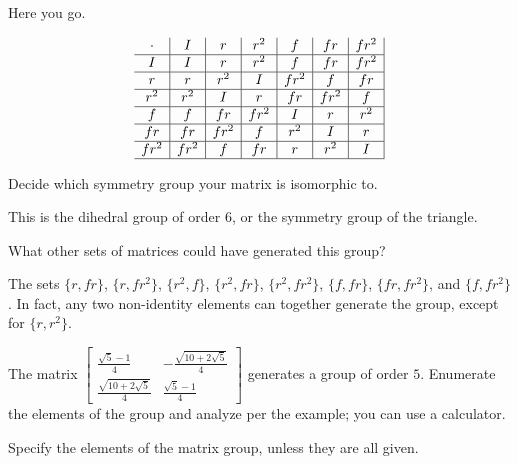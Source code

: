 \documentclass[../key.tex]{subfiles}
\begin{document}
Here you go.

$$\begin{array}{c|c|c|c|c|c|c|}
\cdot & I & r & r^2 & f & fr & fr^2 \\ \hline
I & I & r & r^2 & f & fr & fr^2 \\ \hline
r & r & r^2 & I & fr^2 & f & fr \\ \hline
r^2 & r^2 & I & r & fr & fr^2 & f \\ \hline
f & f & fr & fr^2 & I & r & r^2 \\ \hline
fr & fr & fr^2 & f & r^2 & I & r \\ \hline
fr^2 & fr^2 & f & fr & r & r^2 & I \\ \hline
\end{array}$$

\begin{iinner_problem}
\item Decide which symmetry group your matrix is isomorphic to.
\end{iinner_problem}

This is the dihedral group of order $6$, or the symmetry group of the triangle.

\begin{iinner_problem}
\item What other sets of        matrices could have generated this group?
\end{iinner_problem}

The sets $\{r, fr\}$, $\{r, fr^2\}$, $\{r^2, f\}$, $\{r^2, fr\}$, $\{r^2, fr^2\}$, $\{f,fr\}$, $\{fr,fr^2\}$, and $\{f,fr^2\}$. In fact, any two non-identity elements can together generate the group, except for $\{r, r^2\}$.

\begin{outer_problem}
\item The matrix $\left[\begin{array}{cc} \frac{\sqrt{5}-1}{4} & -\frac{\sqrt{10+2\sqrt{5}}}{4} \\ \frac{\sqrt{10+2\sqrt{5}}}{4} & \frac{\sqrt{5}-1}{4} \end{array}\right]$ generates a group of order $5$. Enumerate the elements of the group and analyze per the example; you can use a calculator.
\end{outer_problem}

\begin{iinner_problem}[start=1]
\item Specify the elements of the matrix group, unless they are all given.
\end{iinner_problem}
\end{document}
